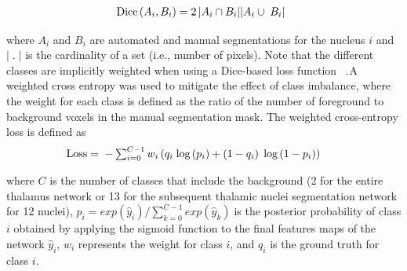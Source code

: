 \let\saveeqnno\theequation
\let\savefrac\frac
\def\dispfrac{\displaystyle\savefrac}
\begin{eqnarray}
\let\frac\dispfrac
\gdef\theequation{2}
\let\theHequation\theequation
\label{disp-formula-group-2aaeb239840b4f1cb28b6c85d1a9f87b}
\begin{array}{@{}l}\text{Dice}\left(A_i,B_i\right)=\frac{2\left\vert A_i\cap B_i\right\vert}{\left\vert A_i\cup\;B_i\right\vert}\end{array}
\end{eqnarray}
\global\let\theequation\saveeqnno
\addtocounter{equation}{-1}\ignorespaces 
where $A_i $ and $B_i $ are automated and manual segmentations for the nucleus $i $ and $\vert\;.\;\vert $ is the cardinality of a set (i.e., number of pixels). Note that the different classes are implicitly weighted when using a Dice-based loss function \unskip~\cite{1643371:26789964,1643371:26789945}.\ensuremath{^{}}A weighted cross entropy was used to mitigate the effect of class imbalance, where the weight for each class is defined as the ratio of the number of foreground to background voxels in the manual segmentation mask. The weighted cross-entropy loss is defined as
\let\saveeqnno\theequation
\let\savefrac\frac
\def\dispfrac{\displaystyle\savefrac}
\begin{eqnarray}
\let\frac\dispfrac
\gdef\theequation{3}
\let\theHequation\theequation
\label{dfg-8128ef3038a4}
\begin{array}{@{}l}\text{Loss}=\;-\sum\nolimits_{i=0}^{C-1}w_i\left(q_i\;\text{log}\left(p_i\right)+\left(1-q_i\right)\;\text{log}\left(1-p_i\right)\right)\;\;\;\;\;\end{array}
\end{eqnarray}
\global\let\theequation\saveeqnno
\addtocounter{equation}{-1}\ignorespaces 
where $C $ is the number of classes that include the background (2 for the entire thalamus network or 13 for the subsequent thalamic nuclei segmentation network for 12 nuclei), $p_i={{exp}{({\widehat y}_i)}}/{\sum\nolimits_{k=0}^{C-1}{{{exp}{({\widehat y}_k)}}\;}} $is the posterior probability of class $i $ obtained by applying the sigmoid function to the final features maps of the network ${\widehat y}_i $, $w_i $ represents the weight for class $i $, and $q_i $ is the ground truth for class $i $.

